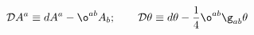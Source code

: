 \begin{equation}\mathcal{D}A^a\equiv
dA^a-\o^{ab}A_b;\quad\quad\mathcal{D}\theta\equiv
d\theta-\frac{1}{4}\o^{ab}\g_{ab}\theta
\end{equation}

